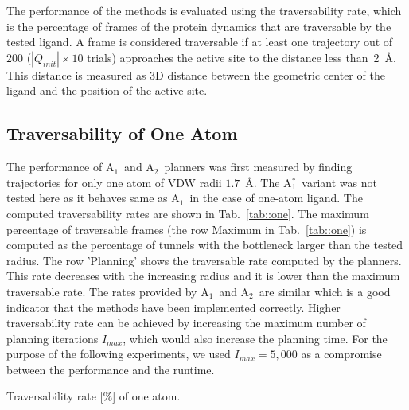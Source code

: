 \documentclass[usletter, 10pt, conference]{ieeeconf} %
\def\QI{Q_{init}}
\def\Imax{I_{max}} %
\def\LA{L_1}
\def\LB{L_2}
\def\RA{A$_{1}$}
\def\RB{A$_{2}$}
\def\RC{A$_{1}^{*}$}
\begin{document}
The performance of the methods is evaluated using the traversability rate, which is the percentage of frames of the protein dynamics that are traversable by the tested ligand.
A frame is considered traversable if at least one trajectory out of 200 ($\!|\QI|\!\times\!\!10$ trials) approaches the active site to the distance less than~2~\AA. 
This distance is measured as 3D distance between the geometric center of the ligand and the position of the active site.


\subsection{Traversability of One Atom}

The performance of \RA\ and \RB\ planners was first measured by finding trajectories for only one atom of VDW radii $1.7$~\AA.
The \RC\ variant was not tested here as it behaves same as \RA\ in the case of one-atom ligand.
The computed traversability rates are shown in Tab.~\ref{tab::one}.
The maximum percentage of traversable frames (the row Maximum in Tab.~\ref{tab::one}) is computed as the percentage of tunnels with the bottleneck larger than the tested radius.
The row 'Planning' shows the traversable rate computed by the planners.
This rate decreases with the increasing radius and it is lower than the maximum traversable rate.
The rates provided by \RA\ and \RB\ are similar which is a good indicator that the methods have been implemented correctly.
Higher traversability rate can be achieved by increasing the maximum number of planning iterations $\Imax$, which would also
increase the planning time.
For the purpose of the following experiments, we used $\Imax=5,000$ as a compromise between the performance and the runtime.

\begin{table}[t]
\centering
\caption{\label{tab::one}
    \small
    Traversability rate [\%] of one atom.
}
\renewcommand{\tabcolsep}{4.3pt}
{\scriptsize
\renewcommand{\arraystretch}{0.7}

}
\end{table}



%
\end{document}
